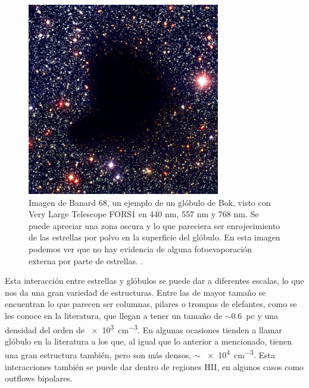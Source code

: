 \documentclass{book}
\begin{document}
\begin{figure}[h!]
    \centering
    \includegraphics[width=0.75\textwidth]{images Chapter 1/C1_Bok_globule.jpg}
    \caption{Imagen de Banard 68, un ejemplo de un glóbulo de Bok, visto con Very Large Telescope FORS1 en 440 nm, 557 nm y 768 nm. Se puede apreciar una zona oscura y lo que pareciera ser enrojecimiento de las estrellas por polvo en la superficie del glóbulo. En esta imagen podemos ver que no hay evidencia de alguna fotoevaporación externa por parte de estrellas. \citep{Alves:2001}.}
    \label{fig:Banard}
\end{figure}

Esta interacción entre estrellas y glóbulos se puede dar a diferentes escalas, lo que nos da una gran variedad de estructuras. Entre las de mayor tamaño se encuentran lo que parecen ser columnas, pilares o trompas de elefantes, como se les conoce en la literatura, que llegan a tener un tamaño de $\sim$\SI{0.6}{pc} y una densidad del orden de \SI{e3}{cm^{-3}}. En algunas ocasiones tienden a llamar glóbulo en la literatura a los que, al igual que lo anterior a mencionado, tienen una gran estructura también, pero son más densos, $\sim$ \SI{e4}{cm^{-3}}. Esta interacciones también se puede dar dentro de regiones HII, en algunos casos como outflows bipolares.
\end{document}
